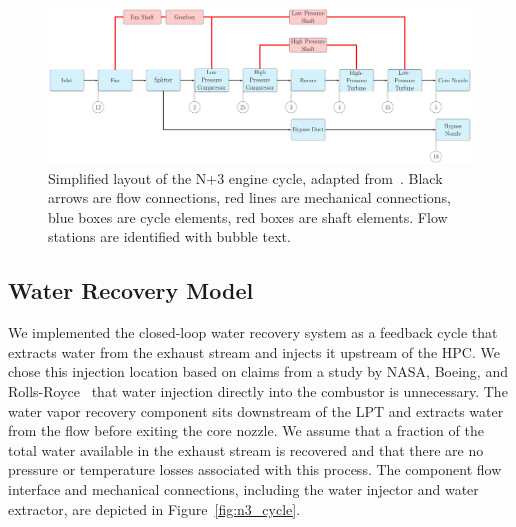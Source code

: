 \documentclass[conf]{new-aiaa}
\begin{document}
\begin{figure}[hbt!]
    \centering
    \includegraphics[width=1.0\textwidth]{N3_cycle.pdf}
    \caption{
        Simplified layout of the N+3 engine cycle, adapted from~\citet{Hendricks2019}.
        Black arrows are flow connections, red lines are mechanical connections, blue boxes are cycle elements, red boxes are shaft elements.
        Flow stations are identified with bubble text.
    }
    \label{fig:N3_original}
\end{figure}

\subsection{Water Recovery Model}
We implemented the closed-loop water recovery system as a feedback cycle that extracts water from the exhaust stream and injects it upstream of the HPC.
We chose this injection location based on claims from a study by NASA, Boeing, and Rolls-Royce~\cite{Daggett2010} that water injection directly into the combustor is unnecessary.
The water vapor recovery component sits downstream of the LPT and extracts water from the flow before exiting the core nozzle.
We assume that a fraction of the total water available in the exhaust stream is recovered and that there are no pressure or temperature losses associated with this process.
The component flow interface and mechanical connections, including the water injector and water extractor, are depicted in Figure~\ref{fig:n3_cycle}.
\end{document}
